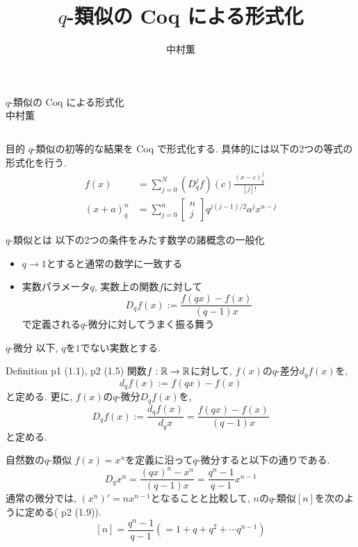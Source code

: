 \documentclass[unicode,mathserif]{beamer}
\title{$q$-類似の Coq による形式化}
\author{中村薫}
\newcommand{\qcoe}[2]{\left[\begin{array}{ccc}#1\\#2\end{array}\right]}
\begin{document}
\begin{frame}[fragile]
  \begin{screen}
    \begin{center}
      {\Huge $q$-類似の Coq による形式化} \\
      {\Large 中村薫} 
    \end{center}
  \end{screen}

	\begin{columns}[T]
		\begin{column}{0.33\columnwidth}
			\begin{block}{目的}
				$q$-類似の初等的な結果を Coq で形式化する.
				具体的には以下の2つの等式の形式化を行う. 
				\begin{align*}
					f(x) &= \sum_{j=0}^N (D_q^jf)(c)\frac{(x-c)^j_q}{[j]!} \\
					(x + a)^n_q &= \sum_{j = 0}^n \qcoe{n}{j} q^{j (j - 1)/2} a^j x^{n - j}
				\end{align*}
			\end{block}
			
		\begin{block}{$q$-類似とは}
			以下の2つの条件をみたす数学の諸概念の一般化
			\begin{itemize}
				\item $q \to 1$とすると通常の数学に一致する
	          \item 実数パラメータ$q$, 実数上の関数$f$に対して
					\[
						D_q f(x) := \frac{f(qx) - f(x)}{(q - 1) x}
					\]
					で定義される$q$-微分に対してうまく振る舞う
			\end{itemize}
		\end{block}

		\begin{block}{$q$-微分}
			以下, $q$を$1$でない実数とする.
			\begin{itembox}{Definition \cite{Kac} p1 (1.1), p2 (1.5)}
				関数$f : \mathbb R \to \mathbb R$に対して, $f(x)$の$q$-差分$d_q f(x)$を, 
				\[
					d_q f(x) := f (qx) - f(x)
				\]
				と定める. 更に, $f(x)$の$q$-微分$D_q f(x)$を, 
	 			\[
					D_q f(x) := \frac{d_q f(x)}{d_q x} = \frac{f(qx) - f(x)}{(q - 1) x}
				\]
				と定める. 
			\end{itembox}
		\end{block}
   
		\begin{block}{自然数の$q$-類似}
			$f(x) = x^n$を定義に沿って$q$-微分すると以下の通りである. 
			\[
				D_q x^n = \frac{(qx)^n - x^n}{(q - 1) x}
							= \frac{q^n - 1}{q - 1} x^{n - 1}
			\]
			通常の微分では, $(x^n)' = n x^{n - 1}$となることと比較して, 
			$n$の$q$-類似$[n]$を次のように定める(\cite{Kac} p2 (1.9)).
			\[
				[n] = \frac{q^n - 1}{q - 1} (= 1 + q + q^2 + \cdots q^{n - 1})
			\]
		\end{block}


\end{column}
\end{columns}
\end{frame}
\end{document}
